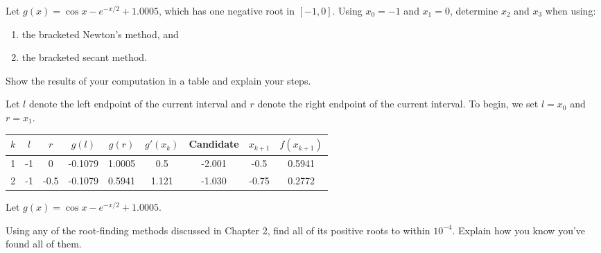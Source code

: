 \documentclass{eh-homework}
\begin{document}
    \begin{question}{4}
    Let \(g(x) = \cos x - e^{-x/2} + 1.0005\), which has one negative root in \([-1, 0]\). Using \(x_0 = -1\) and \(x_1 = 0\), determine \(x_2\) and \(x_3\) when using:
    
    \begin{enumerate}[label=\alph*.]
        \item the bracketed Newton’s method, and
        \item the bracketed secant method.
    \end{enumerate}
    
    Show the results of your computation in a table and explain your steps.

    Let \(l\) denote the left endpoint of the current interval and \(r\) denote the right endpoint of the current interval. To begin, we set \(l = x_0\) and \(r = x_1\).

    \begin{tabular}{c|c|c|c|c|c|c|c|c}
        \(k\) & \(l\) & \(r\) & \(g(l)\) & \(g(r)\) & \(g'(x_{k})\) & Candidate & \(x_{k+1}\) & \(f(x_{k+1})\) \\
        \hline
        1 & -1 & 0 & -0.1079 & 1.0005 & 0.5 & -2.001 & -0.5 & 0.5941 \\
        2 & -1 & -0.5 & -0.1079 & 0.5941 & 1.121 & -1.030 & -0.75 & 0.2772
    \end{tabular}
    \end{question}
    
    \begin{question}{5}
    Let \(g(x) = \cos x - e^{-x/2} + 1.0005\).
    
    Using any of the root-finding methods discussed in Chapter 2, find all of its positive roots to within \(10^{-4}\). Explain how you know you’ve found all of them.
    \end{question}
    
\end{document}
